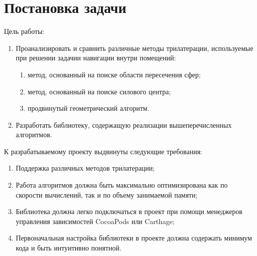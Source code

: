 \section{Постановка задачи}

Цель работы:
\begin{enumerate}
    \item
    Проанализировать и сравнить различные методы трилатерации, используемые при решении задачии навигации внутри помещений:
    \begin{enumerate}
        \item
        метод, основанный на поиске области пересечения сфер;
        \item
        метод, основанный на поиске силового центра;
        \item
        продвинутый геометрический алгоритм.
    \end{enumerate}
    \item
    Разработать библиотеку, содержащую реализации вышеперечисленных алгоритмов.
\end{enumerate}

К разрабатываемому проекту выдвинуты следующие требования:
\begin{enumerate}
    \item
    Поддержка различных методов трилатерации;
    \item
    Работа алгоритмов должна быть максимально оптимизирована как по скорости вычислений, так и по объему занимаемой памяти;
    \item
    Библиотека должна легко подключаться в проект при помощи менеджеров управления зависимостей CocoaPods или Carthage;
    \item
    Первоначальная настройка библиотеки в проекте должна содержать минимум кода и быть интуитивно понятной.
\end{enumerate}